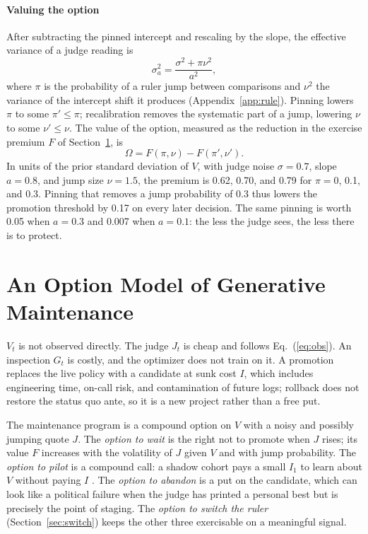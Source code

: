 \documentclass[acmsmall,screen,review,anonymous]{acmart}
\theoremstyle{acmdefinition}
\begin{document}
\paragraph{Valuing the option} After subtracting the pinned intercept and rescaling by the slope, the effective variance of a judge reading is
\begin{equation}\label{eq:sigma}
\sigma_a^2 = \frac{\sigma^2 + \pi\nu^2}{a^2},
\end{equation}
where $\pi$ is the probability of a ruler jump between comparisons and $\nu^2$ the variance of the intercept shift it produces (Appendix~\ref{app:rule}). Pinning lowers $\pi$ to some $\pi' \le \pi$; recalibration removes the systematic part of a jump, lowering $\nu$ to some $\nu' \le \nu$. The value of the option, measured as the reduction in the exercise premium $F$ of Section~\ref{sec:model}, is
\begin{equation}\label{eq:omega}
\Omega = F(\pi,\nu) - F(\pi',\nu').
\end{equation}
In units of the prior standard deviation of $V$, with judge noise $\sigma = 0.7$, slope $a = 0.8$, and jump size $\nu = 1.5$, the premium is 0.62, 0.70, and 0.79 for $\pi = 0$, 0.1, and 0.3. Pinning that removes a jump probability of 0.3 thus lowers the promotion threshold by 0.17 on every later decision. The same pinning is worth 0.05 when $a = 0.3$ and 0.007 when $a = 0.1$: the less the judge sees, the less there is to protect.

\section{An Option Model of Generative Maintenance}\label{sec:model}

$V_t$ is not observed directly. The judge $J_t$ is cheap and follows Eq.~(\ref{eq:obs}). An inspection $G_t$ is costly, and the optimizer does not train on it. A promotion replaces the live policy with a candidate at sunk cost $I$, which includes engineering time, on-call risk, and contamination of future logs; rollback does not restore the status quo ante, so it is a new project rather than a free put.

The maintenance program is a compound option on $V$ with a noisy and possibly jumping quote $J$. The \emph{option to wait} is the right not to promote when $J$ rises; its value $F$ increases with the volatility of $J$ given $V$ and with jump probability. The \emph{option to pilot} is a compound call: a shadow cohort pays a small $I_1$ to learn about $V$ without paying $I$ \citep{tewari2026}. The \emph{option to abandon} is a put on the candidate, which can look like a political failure when the judge has printed a personal best but is precisely the point of staging. The \emph{option to switch the ruler} (Section~\ref{sec:switch}) keeps the other three exercisable on a meaningful signal.
\end{document}
